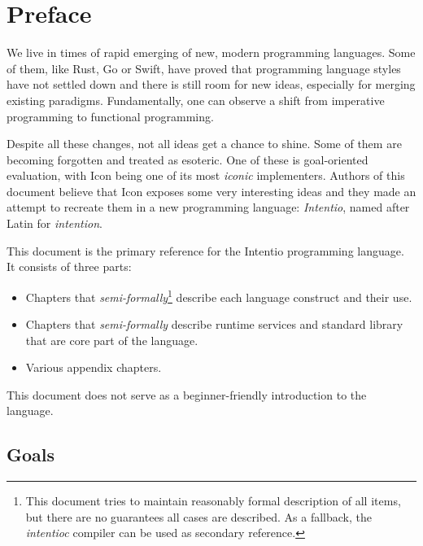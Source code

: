 \chapter{Preface}

We live in times of rapid emerging of new, modern programming languages. Some of them, like Rust\cite{TheRustProgrammingLanguage}, Go\cite{TheGoProgrammingLanguage} or Swift\cite{TheSwiftProgrammingLanguage}, have proved that programming language styles have not settled down and there is still room for new ideas, especially for merging existing paradigms. Fundamentally, one can observe a shift from imperative programming to functional programming.

Despite all these changes, not all ideas get a chance to shine. Some of them are becoming forgotten and treated as esoteric. One of these is goal-oriented evaluation, with Icon\cite{TheIconProgrammingLanguage} being one of its most \emph{iconic} implementers. Authors of this document believe that Icon exposes some very interesting ideas and they made an attempt to recreate them in a new programming language: \emph{Intentio}, named after Latin for \emph{intention}.

This document is the primary reference for the Intentio programming language. It consists of three parts:
\begin{itemize}
  \item Chapters that \emph{semi-formally}\footnote{This document tries to maintain reasonably formal description of all items, but there are no guarantees all cases are described. As a fallback, the \emph{intentioc}\cite{intentioc} compiler can be used as secondary reference.} describe each language construct and their use.
  \item Chapters that \emph{semi-formally} describe runtime services and standard library that are core part of the language.
  \item Various appendix chapters.
\end{itemize}

This document does not serve as a beginner-friendly introduction to the language.

\section*{Goals}


